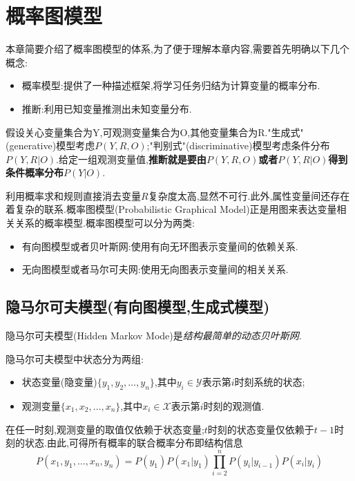 \chapter{概率图模型}

本章简要介绍了概率图模型的体系,为了便于理解本章内容,需要首先明确以下几个概念:
\begin{itemize}
\item 概率模型:提供了一种描述框架,将学习任务归结为计算变量的概率分布.
\item 推断:利用已知变量推测出未知变量分布.
\end{itemize}

假设关心变量集合为Y,可观测变量集合为O,其他变量集合为R."生成式"(generative)模型考虑$P(Y,R,O)$;"判别式"(discriminative)模型考虑条件分布$P(Y,R|O)$.给定一组观测变量值,\textbf{推断就是要由$P(Y,R,O)$或者$P(Y,R|O)$得到条件概率分布$P(Y|O)$}.

利用概率求和规则直接消去变量$R$复杂度太高,显然不可行.此外,属性变量间还存在着复杂的联系.概率图模型(Probabilistic Graphical Model)正是用图来表达变量相关关系的概率模型.概率图模型可以分为两类:
\begin{itemize}
\item 有向图模型或者贝叶斯网:使用有向无环图表示变量间的依赖关系.
\item 无向图模型或者马尔可夫网:使用无向图表示变量间的相关关系.
\end{itemize}

\section{隐马尔可夫模型(有向图模型,生成式模型)}

隐马尔可夫模型(Hidden Markov Mode)是\textit{结构最简单的动态贝叶斯网}.

隐马尔可夫模型中状态分为两组:
\begin{itemize}
\item 状态变量(隐变量)$\{y_1,y_2,\dots,y_n\}$,其中$y_i\in\mathcal Y$表示第$i$时刻系统的状态;
\item 观测变量$\{x_1,x_2,\dots,x_n\}$,其中$x_i\in\mathcal X$表示第$i$时刻的观测值.
\end{itemize}

在任一时刻,观测变量的取值仅依赖于状态变量;$t$时刻的状态变量仅依赖于$t-1$时刻的状态.由此,可得所有概率的联合概率分布即结构信息
\begin{equation}
P(x_1,y_1,\dots,x_n,y_n)=P(y_1)P(x_1|y_1)\prod_{i=2}^nP(y_i|y_{i-1})P(x_i|y_i)
\end{equation}

